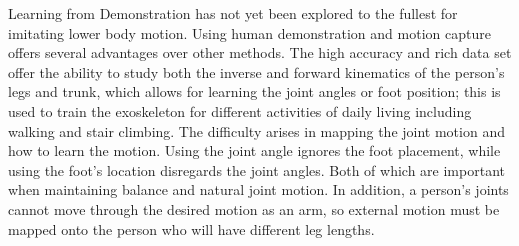 Learning from Demonstration has not yet been explored to the fullest for imitating lower body motion. Using human demonstration and motion capture offers several advantages over other methods. The high accuracy and rich data set offer the ability to study both the inverse and forward kinematics of the person's legs and trunk, which allows for learning the joint angles or foot position; this is used to train the exoskeleton for different activities of daily living including walking and stair climbing. The difficulty arises in mapping the joint motion and how to learn the motion. Using the joint angle ignores the foot placement, while using the foot's location disregards the joint angles. Both of which are important when maintaining balance and natural joint motion. In addition, a person's joints cannot move through the desired motion as an arm, so external motion must be mapped onto the person who will have different leg lengths. 




 
 
